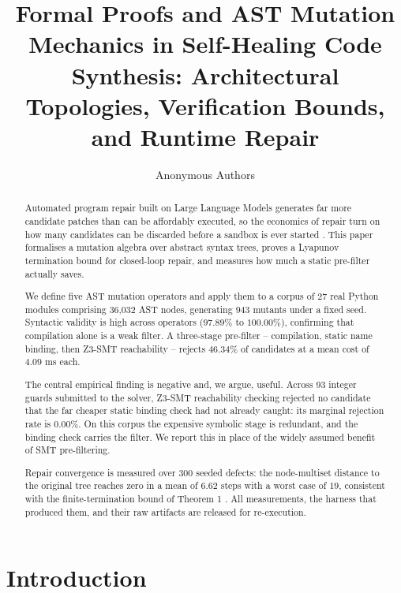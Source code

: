 \documentclass[10pt,twocolumn,letterpaper]{article}
\begin{document}
\title{Formal Proofs and AST Mutation Mechanics in Self-Healing Code Synthesis: Architectural Topologies, Verification Bounds, and Runtime Repair}

\author{
Anonymous Authors
}

\maketitle

\begin{abstract}
Automated program repair built on Large Language Models generates far more candidate patches than can be affordably executed, so the economics of repair turn on how many candidates can be discarded before a sandbox is ever started \cite{arxiv_2405_01543,arxiv_2010_11146}. This paper formalises a mutation algebra over abstract syntax trees, proves a Lyapunov termination bound for closed-loop repair, and measures how much a static pre-filter actually saves.

We define five AST mutation operators and apply them to a corpus of 27 real Python modules comprising 36{,}032 AST nodes, generating 943 mutants under a fixed seed. Syntactic validity is high across operators ($97.89\%$ to $100.00\%$), confirming that compilation alone is a weak filter. A three-stage pre-filter -- compilation, static name binding, then Z3-SMT reachability -- rejects $46.34\%$ of candidates at a mean cost of $4.09$ ms each.

The central empirical finding is negative and, we argue, useful. Across 93 integer guards submitted to the solver, Z3-SMT reachability checking rejected no candidate that the far cheaper static binding check had not already caught: its marginal rejection rate is $0.00\%$. On this corpus the expensive symbolic stage is redundant, and the binding check carries the filter. We report this in place of the widely assumed benefit of SMT pre-filtering.

Repair convergence is measured over 300 seeded defects: the node-multiset distance to the original tree reaches zero in a mean of $6.62$ steps with a worst case of $19$, consistent with the finite-termination bound of Theorem 1 \cite{arxiv_2501_02497}. All measurements, the harness that produced them, and their raw artifacts are released for re-execution.
\end{abstract}






\section{Introduction}
\end{document}

